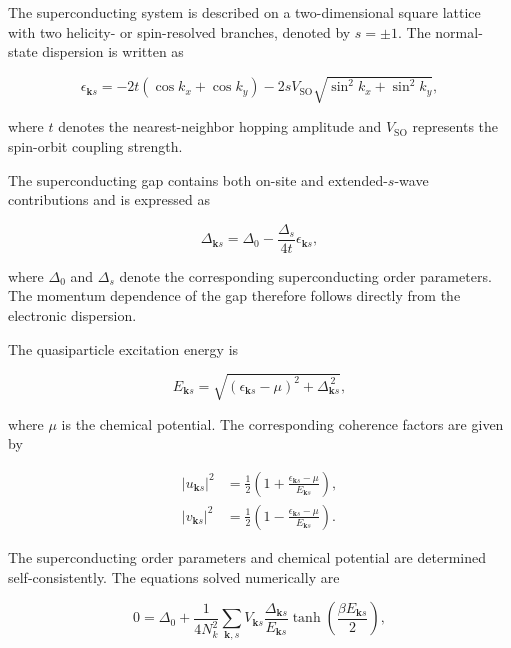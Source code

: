 \documentclass[aps,prb,twocolumn,superscriptaddress,longbibliography]{revtex4-2}
\begin{document}
The superconducting system is described on a two-dimensional square lattice
with two helicity- or spin-resolved branches, denoted by $s=\pm1$.
The normal-state dispersion is written as

\begin{equation}\boxed{
\epsilon_{\mathbf{k}s}
=
-2t(\cos k_x+\cos k_y)
-2sV_{\mathrm{SO}}
\sqrt{\sin^2 k_x+\sin^2 k_y},
}\label{eq:dispersion}\end{equation}

where $t$ denotes the nearest-neighbor hopping amplitude and
$V_{\mathrm{SO}}$ represents the spin-orbit coupling strength.

The superconducting gap contains both on-site and extended-$s$-wave
contributions and is expressed as

\begin{equation}\boxed{
\Delta_{\mathbf{k}s}
=
\Delta_0
-
\frac{\Delta_s}{4t}\epsilon_{\mathbf{k}s},
}\label{eq:gap}\end{equation}

where $\Delta_0$ and $\Delta_s$ denote the corresponding superconducting
order parameters. The momentum dependence of the gap therefore follows
directly from the electronic dispersion.

The quasiparticle excitation energy is

\begin{equation}\boxed{
E_{\mathbf{k}s}
=
\sqrt{
\left(\epsilon_{\mathbf{k}s}-\mu\right)^2
+
\Delta_{\mathbf{k}s}^{\,2}
},
}\label{eq:quasiparticle_energy}\end{equation}

where $\mu$ is the chemical potential. The corresponding coherence factors
are given by

\begin{equation}\boxed{
\begin{aligned}
|u_{\mathbf{k}s}|^{2}
&=
\frac{1}{2}
\left(
1+
\frac{\epsilon_{\mathbf{k}s}-\mu}
{E_{\mathbf{k}s}}
\right),
\\
|v_{\mathbf{k}s}|^{2}
&=
\frac{1}{2}
\left(
1-
\frac{\epsilon_{\mathbf{k}s}-\mu}
{E_{\mathbf{k}s}}
\right).
\end{aligned}
}\label{eq:coherence_factors}\end{equation}

The superconducting order parameters and chemical potential are determined
self-consistently. The equations solved numerically are

\begin{equation}\boxed{
0
=
\Delta_0
+
\frac{1}{4N_k^2}
\sum_{\mathbf{k},s}
V_{\mathbf{k}s}
\frac{\Delta_{\mathbf{k}s}}
{E_{\mathbf{k}s}}
\tanh
\left(
\frac{\beta E_{\mathbf{k}s}}{2}
\right),
}\label{eq:self_consistent_delta0}\end{equation}
\end{document}
